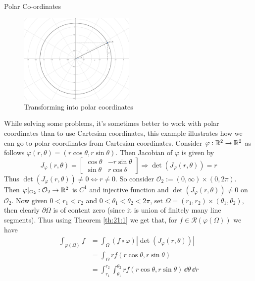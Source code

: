 \documentclass[../Analysis-3]{subfiles}
\begin{document}
\begin{Eg}{Polar Co-ordinates}{}
    \begin{figure}
        \centering
        \includegraphics[width=0.5\textwidth]{../figures/lec21.1.png}
        \caption{Transforming into polar coordinates}
        \label{fig1:21}
    \end{figure}
    While solving some problems, it's sometimes better to work with polar coordinates than to use Cartesian coordinates, this example illustrates how we can go to polar coordinates from Cartesian coordinates.
    Consider $\varphi : \mathbb{R}^2 \to \mathbb{R}^2$ as follows $\varphi(r,\theta) = (r \cos\theta, r \sin\theta)$. Then Jacobian of $\varphi$ is given by
    \[
        J_{\varphi}(r,\theta) = \begin{bmatrix}
            \cos\theta & -r\sin\theta \\
            \sin\theta & r\cos\theta
        \end{bmatrix} \Rightarrow \det(J_{\varphi}(r,\theta)) = r
    \]
    Thus $\det(J_{\varphi}(r,\theta)) \neq 0 \Leftrightarrow r \neq 0$. So consider $\mathcal{O}_2 := (0,\infty) \times (0,2\pi)$. Then $\varphi\vert_{\mathcal{O}_2} : \mathcal{O}_2 \to \mathbb{R}^2$ is $C^1$ and injective function and $\det(J_{\varphi}(r,\theta)) \neq 0 $ on $\mathcal{O}_2$. Now given $0 < r_1 < r_2$ and $0 < \theta_1 < \theta_2 < 2\pi$, set $\Omega = (r_1, r_2) \times (\theta_1, \theta_2)$, then clearly $\partial \Omega$ is of content zero (since it is union of finitely many line segments). Thus using Theorem \ref{th:21:1} we get that, for $f \in \mathscr{R}(\varphi(\Omega))$ we have
    \begin{align*}
        \int_{\varphi(\Omega)} f & = \int_{\Omega} (f \circ \varphi) |\det (J_{\varphi}(r,\theta))|                                 \\
                                 & = \int_{\Omega} r f(r\cos\theta, r\sin\theta)                                                    \\
                                 & = \int_{r_1}^{r_2} \int_{\theta_1}^{\theta_2} r f(r\cos\theta, r\sin\theta)\, \dd\theta \, \dd r
    \end{align*}


\end{Eg}
\end{document}
